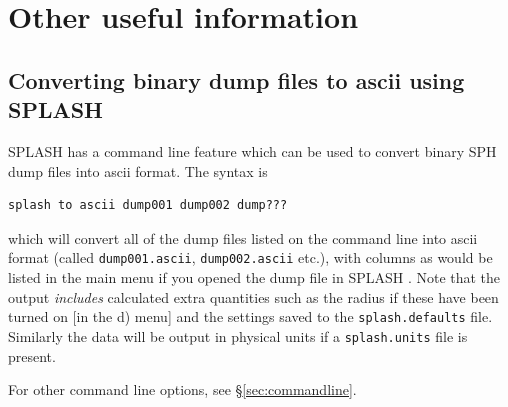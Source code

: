 \documentclass[a4paper,10pt]{article}
\newcommand{\splash}{\textsc{SPLASH }}
\begin{document}
\section{Other useful information}

\subsection{Converting binary dump files to ascii using \splash}
\label{sec:convert}
 \splash has a command line feature which can be used to convert binary SPH dump files into ascii format. The syntax is
\begin{verbatim}
splash to ascii dump001 dump002 dump???
\end{verbatim}
which will convert all of the dump files listed on the command line into ascii format (called \verb+dump001.ascii+, \verb+dump002.ascii+ etc.), with columns as would be listed in the main menu if you opened the dump file in \splash. Note that the output \emph{includes} calculated extra quantities such as the radius if these have been turned on [in the d) menu] and the settings saved to the \verb+splash.defaults+ file. Similarly the data will be output in physical units if a \verb+splash.units+ file is present.

  For other command line options, see \S\ref{sec:commandline}.
\end{document}
